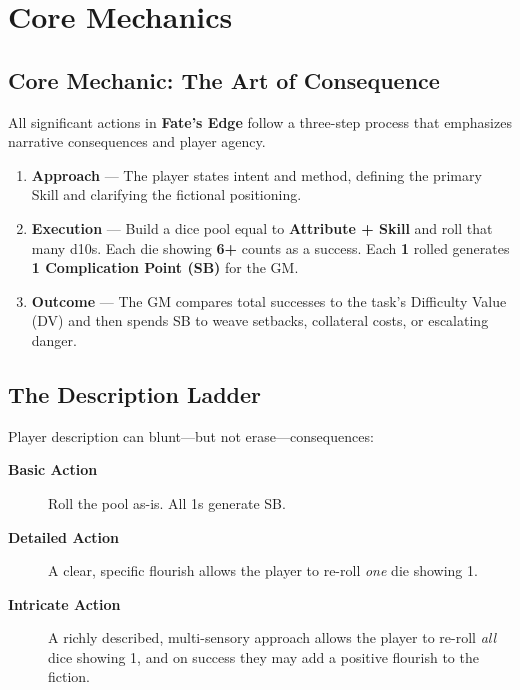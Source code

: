 \chapter{Core Mechanics}
\label{chap:core-mechanics}

\section{Core Mechanic: The Art of Consequence}
\label{sec:core-mechanic}

All significant actions in \textbf{Fate's Edge} follow a three-step process that emphasizes narrative consequences and player agency.

\begin{enumerate}
\item \textbf{Approach} — The player states intent and method, defining the primary Skill and clarifying the fictional positioning. 
\item \textbf{Execution} — Build a dice pool equal to \textbf{Attribute + Skill} and roll that many d10s. Each die showing \textbf{6+} counts as a success. Each \textbf{1} rolled generates \textbf{1 Complication Point (SB)} for the GM. 
\item \textbf{Outcome} — The GM compares total successes to the task’s Difficulty Value (DV) and then spends SB to weave setbacks, collateral costs, or escalating danger. 
\end{enumerate}

\section{The Description Ladder}
\label{sec:description-ladder}

Player description can blunt—but not erase—consequences:

\begin{description}
\item[\textbf{Basic Action}] Roll the pool as-is. All 1s generate SB. 
\item[\textbf{Detailed Action}] A clear, specific flourish allows the player to re-roll \emph{one} die showing 1. 
\item[\textbf{Intricate Action}] A richly described, multi-sensory approach allows the player to re-roll \emph{all} dice showing 1, and on success they may add a positive flourish to the fiction. 
\end{description}

